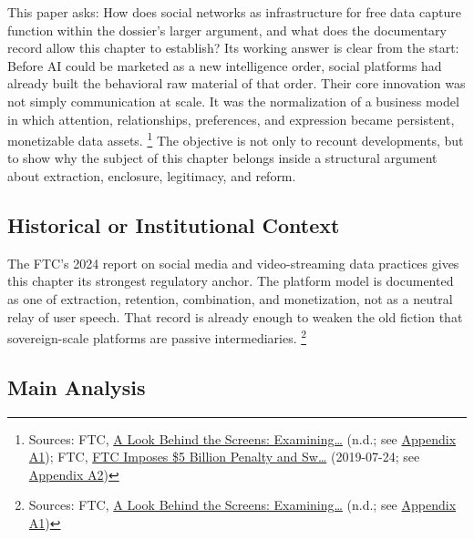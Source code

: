 \documentclass[
  american,
  11pt,
  letterpaper,
]{article}
\begin{document}
This paper asks: How does social networks as infrastructure for free
data capture function within the dossier's larger argument, and what
does the documentary record allow this chapter to establish? Its working
answer is clear from the start: Before AI could be marketed as a new
intelligence order, social platforms had already built the behavioral
raw material of that order. Their core innovation was not simply
communication at scale. It was the normalization of a business model in
which attention, relationships, preferences, and expression became
persistent, monetizable data assets. \footnote{Sources: FTC,
  \href{https://www.ftc.gov/reports/look-behind-screens-examining-data-practices-social-media-video-streaming-services}{A
  Look Behind the Screens: Examining\ldots{}} (n.d.; see
  \hyperref[appendix-a1-a-look-behind-the-screens-examining-the-data-practices-of-social-media-and-video-streaming-services]{Appendix
  A1}); FTC,
  \href{https://www.ftc.gov/news-events/news/press-releases/2019/07/ftc-imposes-5-billion-penalty-sweeping-new-privacy-restrictions-facebook}{FTC
  Imposes \$5 Billion Penalty and Sw\ldots{}} (2019-07-24; see
  \hyperref[appendix-a2-ftc-imposes-5-billion-penalty-and-sweeping-new-privacy-restrictions-on-facebook]{Appendix
  A2})} The objective is not only to recount developments, but to show
why the subject of this chapter belongs inside a structural argument
about extraction, enclosure, legitimacy, and reform.

\subsection{Historical or Institutional
Context}\label{historical-or-institutional-context}

The FTC's 2024 report on social media and video-streaming data practices
gives this chapter its strongest regulatory anchor. The platform model
is documented as one of extraction, retention, combination, and
monetization, not as a neutral relay of user speech. That record is
already enough to weaken the old fiction that sovereign-scale platforms
are passive intermediaries. \footnote{Sources: FTC,
  \href{https://www.ftc.gov/reports/look-behind-screens-examining-data-practices-social-media-video-streaming-services}{A
  Look Behind the Screens: Examining\ldots{}} (n.d.; see
  \hyperref[appendix-a1-a-look-behind-the-screens-examining-the-data-practices-of-social-media-and-video-streaming-services]{Appendix
  A1})}

\subsection{Main Analysis}\label{main-analysis}
\end{document}
